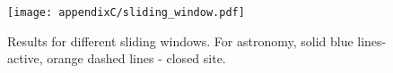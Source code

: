 \begin{figure}[!ht]
	\centering
	\texttt{[image: appendixC/sliding\_window.pdf]}
	\caption[Stack Exchange properties for different sliding window.]{Results for different sliding windows. For astronomy, solid blue lines- active, orange dashed lines - closed site. }
	\label{fig:windows}
\end{figure}

